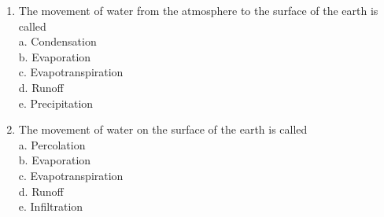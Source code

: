 \begin{enumerate}
\item The movement of water from the atmosphere to the surface of the earth is called\\
a. Condensation\\
b. Evaporation\\
c. Evapotranspiration\\
d. Runoff\\
e. Precipitation\\
\item The movement of water on the surface of the earth is called\\
a. Percolation\\
b. Evaporation\\
c. Evapotranspiration\\
d. Runoff\\
e. Infiltration\\


\end{enumerate}
